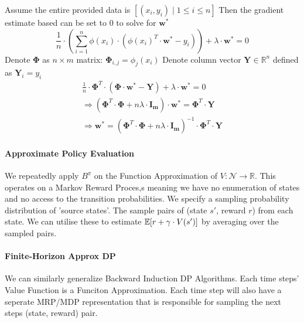 \documentclass[11pt]{article}
\begin{document}
Assume the entire provided data is $\left[\left(x_i, y_i\right) \mid 1 \leq i \leq n\right]$
Then the gradient estimate based can be set to 0 to solve for $\boldsymbol{w}^*$
$$
\frac{1}{n} \cdot\left(\sum_{i=1}^n \phi\left(x_i\right) \cdot\left(\phi\left(x_i\right)^T \cdot \boldsymbol{w}^*-y_i\right)\right)+\lambda \cdot \boldsymbol{w}^*=0
$$
Denote $\boldsymbol{\Phi}$ as $n \times m$ matrix: $\boldsymbol{\Phi}_{i, j}=\phi_j\left(x_i\right)$
Denote column vector $\boldsymbol{Y} \in \mathbb{R}^n$ defined as $\boldsymbol{Y}_i=y_i$
$$
\begin{gathered}
\frac{1}{n} \cdot \boldsymbol{\Phi}^T \cdot\left(\boldsymbol{\Phi} \cdot \boldsymbol{w}^*-\boldsymbol{Y}\right)+\lambda \cdot \boldsymbol{w}^*=0 \\
\Rightarrow\left(\boldsymbol{\Phi}^T \cdot \boldsymbol{\Phi}+n \lambda \cdot \boldsymbol{I}_{\boldsymbol{m}}\right) \cdot \boldsymbol{w}^*=\boldsymbol{\Phi}^T \cdot \boldsymbol{Y} \\
\Rightarrow \boldsymbol{w}^*=\left(\boldsymbol{\Phi}^T \cdot \boldsymbol{\Phi}+n \lambda \cdot \boldsymbol{I}_{\boldsymbol{m}}\right)^{-1} \cdot \boldsymbol{\Phi}^T \cdot \boldsymbol{Y}
\end{gathered}
$$

\paragraph*{Approximate Policy Evaluation}
We repeatedly apply $B^\pi$ on the Function Approximation of $V:\mathcal{N}\rightarrow\mathbb{R}$. This operates on a Markov Reward Proces,s meaning we have no enumeration of states and no access to the transition probabilities. 
We specify a sampling probability distribution of 'source states'. The sample pairs of (state $s'$, reward $r$) from each state. We can utilise these to estimate $\mathbb{E}[r + \gamma\cdot V(s')]$ by averaging over the sampled pairs. 

\paragraph*{Finite-Horizon Approx DP}
We can similarly generalize Backward Induction DP Algorithms. Each time steps' Value Function is a Funciton Approximation. Each time step will also have a seperate MRP/MDP representation that is responsible for sampling the next steps (state, reward) pair.
\end{document}
